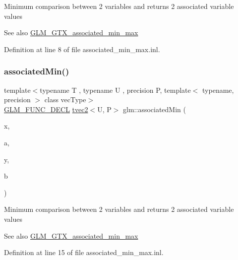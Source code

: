 Minimum comparison between 2 variables and returns 2 associated variable values \begin{DoxySeeAlso}{See also}
\mbox{\hyperlink{group__gtx__associated__min__max}{G\+L\+M\+\_\+\+G\+T\+X\+\_\+associated\+\_\+min\+\_\+max}} 
\end{DoxySeeAlso}


Definition at line 8 of file associated\+\_\+min\+\_\+max.\+inl.

\mbox{\label{group__gtx__associated__min__max_ga8b538d10872626668a078e2bd495af25}} 
\subsubsection{\texorpdfstring{associatedMin()}{associatedMin()}\hspace{0.1cm}{\footnotesize\ttfamily [2/10]}}
{\footnotesize\ttfamily template$<$typename T , typename U , precision P, template$<$ typename, precision $>$ class vec\+Type$>$ \\
\mbox{\hyperlink{setup_8hpp_ab2d052de21a70539923e9bcbf6e83a51}{G\+L\+M\+\_\+\+F\+U\+N\+C\+\_\+\+D\+E\+CL}} \mbox{\hyperlink{structglm_1_1tvec2}{tvec2}}$<$U, P$>$ glm\+::associated\+Min (\begin{DoxyParamCaption}\item[{vec\+Type$<$ T, P $>$ const \&}]{x,  }\item[{vec\+Type$<$ U, P $>$ const \&}]{a,  }\item[{vec\+Type$<$ T, P $>$ const \&}]{y,  }\item[{vec\+Type$<$ U, P $>$ const \&}]{b }\end{DoxyParamCaption})}

Minimum comparison between 2 variables and returns 2 associated variable values \begin{DoxySeeAlso}{See also}
\mbox{\hyperlink{group__gtx__associated__min__max}{G\+L\+M\+\_\+\+G\+T\+X\+\_\+associated\+\_\+min\+\_\+max}} 
\end{DoxySeeAlso}


Definition at line 15 of file associated\+\_\+min\+\_\+max.\+inl.

\mbox{\label{group__gtx__associated__min__max_ga1dccff48fa5650c746533de83467da6e}} 
